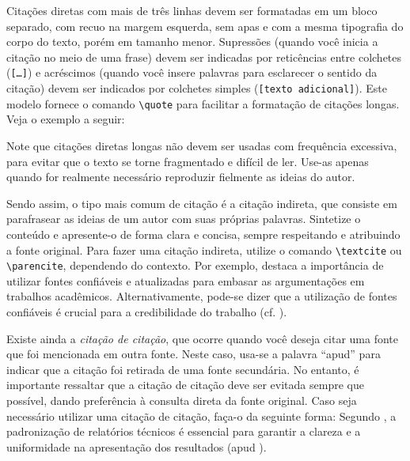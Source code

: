 Citações diretas com mais de três linhas devem ser formatadas em um bloco separado, com recuo na
margem esquerda, sem apas e com a mesma tipografia do corpo do texto, porém em tamanho menor.
Supressões (quando você inicia a citação no meio de uma frase) devem ser indicadas por reticências entre colchetes
(\texttt{[\ldots]}) e acréscimos (quando você insere palavras para esclarecer o sentido da citação)
devem ser indicados por colchetes simples (\texttt{[texto adicional]}). Este modelo fornece o
comando \texttt{\textbackslash quote{}{}} para facilitar a formatação de citações longas. Veja o exemplo
a seguir:


Note que citações diretas longas não devem ser usadas com frequência excessiva, para evitar que o
texto se torne fragmentado e difícil de ler. Use-as apenas quando for realmente necessário
reproduzir fielmente as ideias do autor.

Sendo assim, o tipo mais comum de citação é a citação indireta,
que consiste em parafrasear as ideias de um autor com suas próprias palavras. Sintetize o conteúdo e
apresente-o de forma clara e concisa, sempre respeitando e atribuindo a fonte original.
Para fazer uma citação indireta, utilize o comando \texttt{\textbackslash textcite} ou
\texttt{\textbackslash parencite}, dependendo do contexto. Por exemplo, \textcite{silva2020} destaca a importância de
utilizar fontes confiáveis e atualizadas para embasar as argumentações em trabalhos acadêmicos.
Alternativamente, pode-se dizer que a utilização de fontes confiáveis é crucial para a credibilidade
do trabalho (cf. \parencite{silva2020}).

Existe ainda a \emph{citação de citação}, que ocorre quando você deseja citar uma fonte que foi
mencionada em outra fonte. Neste caso, usa-se a palavra ``apud'' para indicar que a citação foi
retirada de uma fonte secundária. No entanto, é importante ressaltar que a citação de citação deve
ser evitada sempre que possível, dando preferência à consulta direta da fonte original. Caso seja
necessário utilizar uma citação de citação, faça-o da seguinte forma: Segundo \textcite[p. 45]{rodrigues2017}, a padronização de relatórios técnicos é essencial para garantir a clareza e a uniformidade na apresentação dos resultados (apud \textcite{lima2022}).

